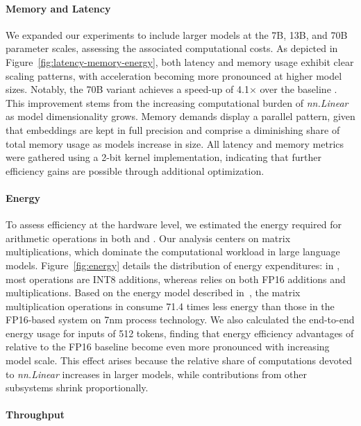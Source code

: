\paragraph{Memory and Latency}

We expanded our experiments to include larger models at the 7B, 13B, and 70B parameter scales, assessing the associated computational costs. As depicted in Figure~\ref{fig:latency-memory-energy}, both latency and memory usage exhibit clear scaling patterns, with acceleration becoming more pronounced at higher model sizes. Notably, the  70B variant achieves a speed-up of 4.1$\times$ over the baseline . This improvement stems from the increasing computational burden of \emph{nn.Linear} as model dimensionality grows. Memory demands display a parallel pattern, given that embeddings are kept in full precision and comprise a diminishing share of total memory usage as models increase in size. All latency and memory metrics were gathered using a 2-bit kernel implementation, indicating that further efficiency gains are possible through additional optimization.

\paragraph{Energy}

To assess efficiency at the hardware level, we estimated the energy required for arithmetic operations in both  and . Our analysis centers on matrix multiplications, which dominate the computational workload in large language models. Figure~\ref{fig:energy} details the distribution of energy expenditures: in , most operations are INT8 additions, whereas  relies on both FP16 additions and multiplications. Based on the energy model described in~\cite{energycost, pokebnn}, the matrix multiplication operations in  consume 71.4 times less energy than those in the FP16-based system on 7nm process technology. We also calculated the end-to-end energy usage for inputs of 512 tokens, finding that energy efficiency advantages of  relative to the FP16  baseline become even more pronounced with increasing model scale. This effect arises because the relative share of computations devoted to \emph{nn.Linear} increases in larger models, while contributions from other subsystems shrink proportionally.

\paragraph{Throughput}

